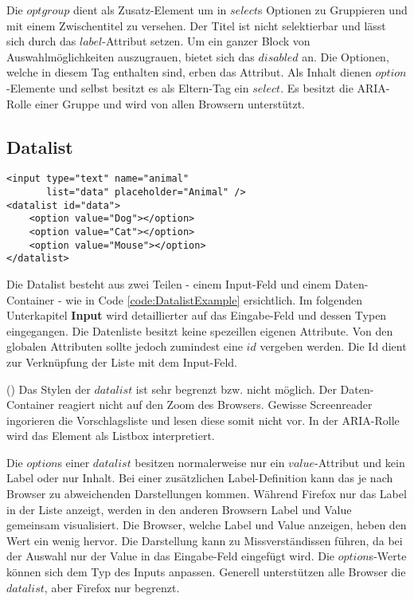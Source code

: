 Die $optgroup$ dient als Zusatz-Element um in $select$s Optionen zu Gruppieren und mit einem Zwischentitel zu versehen.
Der Titel ist nicht selektierbar und lässt sich durch das $label$-Attribut setzen. 
Um ein ganzer Block von Auswahlmöglichkeiten auszugrauen, bietet sich das $disabled$ an.
Die Optionen, welche in diesem Tag enthalten sind, erben das Attribut.
Als Inhalt dienen $option$-Elemente und selbst besitzt es als Eltern-Tag ein $select$.
Es besitzt die ARIA-Rolle einer Gruppe und wird von allen Browsern unterstützt.


\subsection{Datalist}

\begin{lstlisting}[style = htmlcssjs, caption = Datalist Example, label = code:DatalistExample]
<input type="text" name="animal" 
       list="data" placeholder="Animal" />
<datalist id="data">
    <option value="Dog"></option>
    <option value="Cat"></option>
    <option value="Mouse"></option>
</datalist>
\end{lstlisting}

Die Datalist besteht aus zwei Teilen - einem Input-Feld und einem Daten-Container - wie in Code \ref{code:DatalistExample} ersichtlich. 
Im folgenden Unterkapitel \textbf{Input} wird detaillierter auf das Eingabe-Feld und dessen Typen eingegangen.
Die Datenliste besitzt keine spezeillen eigenen Attribute.
Von den globalen Attributen sollte jedoch zumindest eine $id$ vergeben werden.
Die Id dient zur Verknüpfung der Liste mit dem Input-Feld. 

(\cite{datalistMdn}) Das Stylen der $datalist$ ist sehr begrenzt bzw. nicht möglich. 
Der Daten-Container reagiert nicht auf den Zoom des Browsers.
Gewisse Screenreader ingorieren die Vorschlagsliste und lesen diese somit nicht vor.
In der ARIA-Rolle wird das Element als Listbox interpretiert.

Die $option$s einer $datalist$ besitzen normalerweise nur ein $value$-Attribut und kein Label oder nur Inhalt.
Bei einer zusätzlichen Label-Definition kann das je nach Browser zu abweichenden Darstellungen kommen. 
Während Firefox nur das Label in der Liste anzeigt, werden in den anderen Browsern Label und Value gemeinsam visualisiert. 
Die Browser, welche Label und Value anzeigen, heben den Wert ein wenig hervor.
Die Darstellung kann zu Missverständissen führen, da bei der Auswahl nur der Value in das Eingabe-Feld eingefügt wird. 
Die $option$s-Werte können sich dem Typ des Inputs anpassen. 
Generell unterstützen alle Browser die $datalist$, aber Firefox nur begrenzt.

